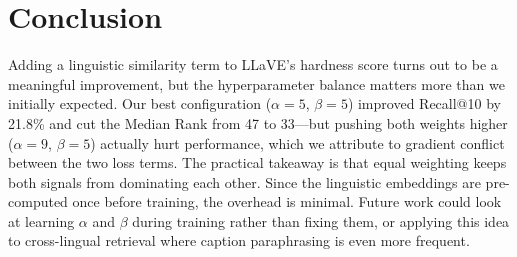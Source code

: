 \documentclass[10pt,twocolumn,letterpaper]{article}
\begin{document}
\section{Conclusion}

Adding a linguistic similarity term to LLaVE's hardness score turns out to be a meaningful improvement, but the hyperparameter balance matters more than we initially expected.
Our best configuration ($\alpha{=}5$, $\beta{=}5$) improved Recall@10 by 21.8\% and cut the Median Rank from 47 to 33---but pushing both weights higher ($\alpha{=}9$, $\beta{=}5$) actually hurt performance, which we attribute to gradient conflict between the two loss terms.
The practical takeaway is that equal weighting keeps both signals from dominating each other.
Since the linguistic embeddings are pre-computed once before training, the overhead is minimal.
Future work could look at learning $\alpha$ and $\beta$ during training rather than fixing them, or applying this idea to cross-lingual retrieval where caption paraphrasing is even more frequent.

{\small


}
\end{document}
